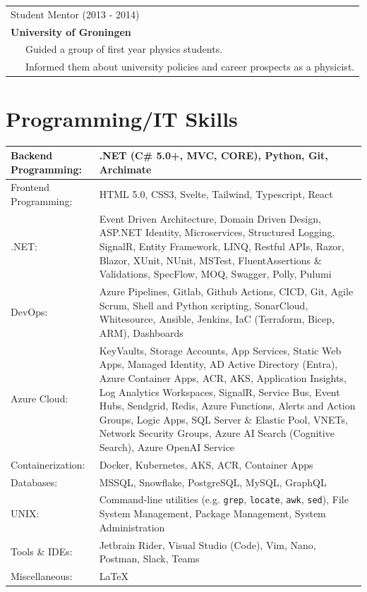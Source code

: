\documentclass[a4paper,8pt]{article}
\begin{document}
 \begin{tabular}{l}
Student Mentor (2013 - 2014) \\ 
\textbf{University of Groningen}\\
\ \ \ {\small Guided a group of first year physics students.} \\

\ \ \ {\small Informed them about university policies and career prospects as a physicist.}
\end{tabular}

\section{Programming/IT Skills}
\begin{tabular}{||p{5cm}|p{8cm}||}
\hline
Backend Programming: &  .NET (C\# 5.0+, MVC, CORE), Python, Git, Archimate \\
\hline
Frontend Programming: & HTML 5.0, CSS3, Svelte, Tailwind, Typescript, React \\
\hline
.NET:& Event Driven Architecture, Domain Driven Design, ASP.NET Identity, Microservices, Structured Logging, SignalR, Entity Framework, LINQ, Restful APIs, Razor, Blazor, XUnit, NUnit, MSTest, FluentAssertions \& Validations, SpecFlow, MOQ, Swagger, Polly, Pulumi \\
\hline
DevOps: & Azure Pipelines, Gitlab, Github Actions, CI\/CD, Git, Agile Scrum, Shell and Python scripting, SonarCloud, Whitesource, Ansible, Jenkins, IaC (Terraform, Bicep, ARM), Dashboards \\
\hline
Azure Cloud: & KeyVaults, Storage Accounts, App Services, Static Web Apps,
Managed Identity, AD Active Directory (Entra), Azure
Container Apps, ACR, AKS,
Application Insights, Log Analytics Workspaces,
SignalR, Service Bus, Event Hubs, Sendgrid, Redis,
Azure Functions, Alerts and Action Groups, Logic Apps,
SQL Server \& Elastic Pool, VNETs, Network Security Groups,
Azure AI Search (Cognitive Search), Azure OpenAI Service \\
\hline
Containerization: & Docker, Kubernetes, AKS, ACR, Container Apps \\
\hline
Databases: & MSSQL, Snowflake, PostgreSQL, MySQL, GraphQL \\
\hline
UNIX: & Command-line utilities (e.g. \verb|grep|, \verb|locate|, \verb|awk|, \verb|sed|), File System Management, Package Management, System Administration \\
\hline
Tools \& IDEs: & Jetbrain Rider, Visual Studio (Code), Vim, Nano, Postman, Slack, Teams \\
\hline
Miscellaneous: & \LaTeX \\
\hline
\end{tabular}
\end{document}
